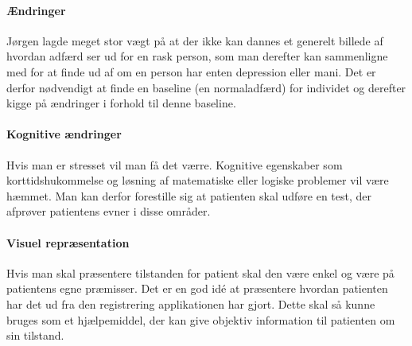 \paragraph{Ændringer}
Jørgen lagde meget stor vægt på at der ikke kan dannes et generelt billede af hvordan adfærd ser ud for en rask person, som man derefter kan sammenligne med for at finde ud af om en person har enten depression eller mani.
Det er derfor nødvendigt at finde en baseline (en normaladfærd) for individet og derefter kigge på ændringer i forhold til denne baseline.

\paragraph{Kognitive ændringer}
Hvis man er stresset vil man få det værre. 
Kognitive egenskaber som korttidshukommelse og løsning af matematiske eller logiske problemer vil være hæmmet.
Man kan derfor forestille sig at patienten skal udføre en test, der afprøver patientens evner i disse områder.

\paragraph{Visuel repræsentation}
Hvis man skal præsentere tilstanden for patient skal den være enkel og være på patientens egne præmisser. 
Det er en god idé at præsentere hvordan patienten har det ud fra den registrering applikationen har gjort. 
Dette skal så kunne bruges som et hjælpemiddel, der kan give objektiv information til patienten om sin tilstand.
